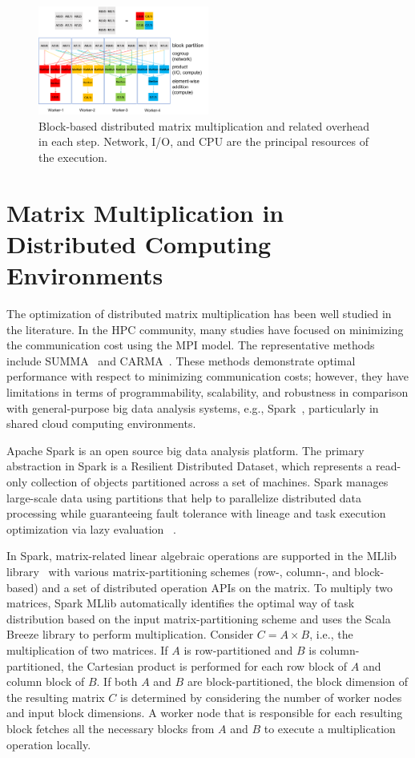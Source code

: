 \documentclass[10pt, conference, compsocconf]{IEEEtran}
\begin{document}
\begin{figure}[ht]
	\centering\includegraphics[width=0.5\textwidth]{figures/matmult-overhead-non-square-1.pdf}\caption{Block-based distributed matrix multiplication and related overhead in each step. Network, I/O, and CPU are the principal resources of the execution.}\label{fig:matmul-with-overhead}
\end{figure}

\section{Matrix Multiplication in Distributed Computing Environments}\label{sec:distributed-matrix-computation}
The optimization of distributed matrix multiplication has been well studied in the literature. In the HPC community, many studies have focused on minimizing the communication cost using the MPI model. The representative methods include SUMMA~\cite{summa} and CARMA~\cite{carma}. These methods demonstrate optimal performance with respect to minimizing communication costs; however, they have limitations in terms of programmability, scalability, and robustness in comparison with general-purpose big data analysis systems, e.g., Spark~\cite{spark}, particularly in shared cloud computing environments.

Apache Spark is an open source big data analysis platform. The primary abstraction in Spark is a Resilient Distributed Dataset, which represents a read-only collection of objects partitioned across a set of machines. Spark manages large-scale data using partitions that help to parallelize distributed data processing while guaranteeing fault tolerance with lineage and task execution optimization via lazy evaluation ~\cite{spark}.

In Spark, matrix-related linear algebraic operations are supported in the MLlib library~\cite{spark-mm} with various matrix-partitioning schemes (row-, column-, and block-based) and a set of distributed operation APIs on the matrix. To multiply two matrices, Spark MLlib automatically identifies the optimal way of task distribution based on the input matrix-partitioning scheme and uses the Scala Breeze library to perform multiplication. Consider $C = A \times B$, i.e., the multiplication of two matrices. If $A$ is row-partitioned and $B$ is column-partitioned, the Cartesian product is performed for each row block of $A$ and column block of $B$. If both $A$ and $B$ are block-partitioned, the block dimension of the resulting matrix $C$ is determined by considering the number of worker nodes and input block dimensions. A worker node that is responsible for each resulting block fetches all the necessary blocks from $A$ and $B$ to execute a multiplication operation locally.
\end{document}
